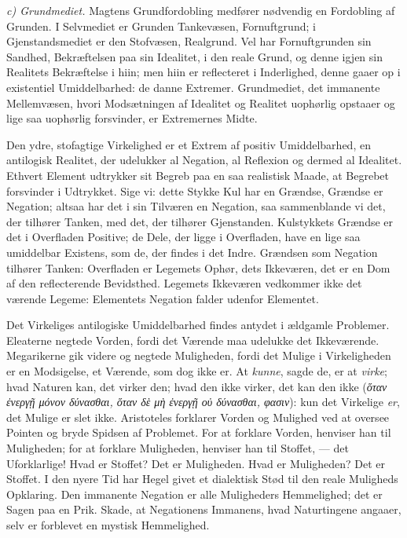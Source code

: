 \documentclass[12pt,a4paper]{book}
\newcommand{\runin}[1]{\emph{#1}\hspace{0.4em}}
\begin{document}
\runin{c) Grundmediet.} Magtens Grundfordobling medfører nødvendig en
Fordobling af Grunden. I Selvmediet er Grunden Tankevæsen, Fornuftgrund; i
Gjenstandsmediet er den Stofvæsen, Realgrund. Vel har Fornuftgrunden sin
Sandhed, Bekræftelsen paa sin Idealitet, i den reale Grund, og denne igjen
sin Realitets Bekræftelse i hiin; men hiin er reflecteret i Inderlighed,
denne gaaer op i existentiel Umiddelbarhed: de danne Extremer.
Grundmediet, det immanente Mellemvæsen, hvori Modsætningen af Idealitet og
Realitet uophørlig opstaaer og lige saa uophørlig forsvinder, er
Extremernes Midte.

Den ydre, stofagtige Virkelighed er et Extrem af positiv Umiddelbarhed, en
antilogisk Realitet, der udelukker al Negation, al Reflexion og dermed al
Idealitet. Ethvert Element udtrykker sit Begreb paa en saa realistisk
Maade, at Begrebet forsvinder i Udtrykket. Sige vi: dette Stykke Kul har
en Grændse, Grændse er Negation; altsaa har det i sin Tilværen en
Negation, saa sammenblande vi det, der tilhører Tanken, med det, der
tilhører Gjenstanden. Kulstykkets
Grændse er det i Overfladen Positive; de Dele, der ligge i Overfladen,
have en lige saa umiddelbar Existens, som de, der findes i det Indre.
Grændsen som Negation tilhører Tanken: Overfladen er Legemets Ophør, dets
Ikkeværen, det er en Dom af den reflecterende Bevidsthed. Legemets
Ikkeværen vedkommer ikke det værende Legeme: Elementets Negation falder
udenfor Elementet.

Det Virkeliges antilogiske Umiddelbarhed findes antydet i ældgamle
Problemer. Eleaterne negtede Vorden, fordi det Værende maa udelukke det
Ikkeværende. Megarikerne gik videre og negtede Muligheden, fordi det
Mulige i Virkeligheden er en Modsigelse, et Værende, som dog ikke er. At
\emph{kunne}, sagde de, er at \emph{virke}; hvad Naturen kan, det virker
den; hvad den ikke virker, det kan den ikke
(\textit{ὅταν ἐνεργῇ μόνον δύνασθαι, ὅταν δὲ μὴ ἐνεργῇ οὐ δύνασθαι,
φασιν}): kun det Virkelige \emph{er}, det Mulige er slet ikke. Aristoteles
forklarer Vorden og Mulighed ved at oversee Pointen og bryde Spidsen af
Problemet. For at forklare Vorden, henviser han til Muligheden; for at
forklare Muligheden, henviser han til Stoffet, --- det Uforklarlige! Hvad
er Stoffet? Det er Muligheden. Hvad er Muligheden? Det er Stoffet. I den
nyere Tid har Hegel givet et dialektisk Stød til den reale Muligheds
Opklaring. Den immanente Negation er alle Muligheders Hemmelighed; det er
Sagen paa en Prik. Skade, at Negationens Immanens, hvad Naturtingene
angaaer, selv er forblevet en mystisk Hemmelighed.
\end{document}
